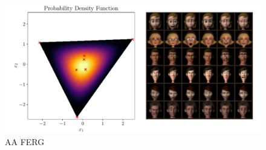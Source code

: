 \begin{figure}[htpb]
    \centering
    \includegraphics[width=1\linewidth]{figures/samples/aa_ferg.pdf}
    \caption{AA FERG}%
    \label{fig:aa_ferg}
\end{figure}


